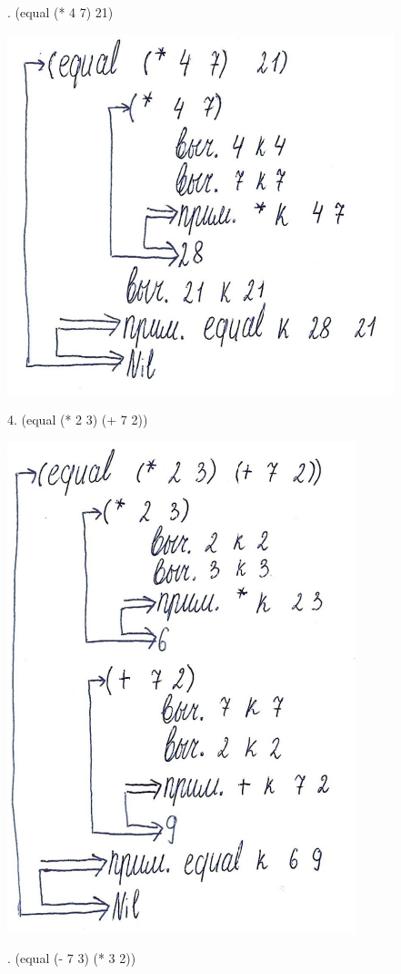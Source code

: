 \documentclass[12pt]{report}
\begin{document}
. (equal (* 4 7) 21)

\includegraphics[scale=1.5]{img/1.3}

4. (equal (* 2 3) (+ 7 2))

\includegraphics[scale=1.5]{img/1.4}

. (equal (- 7 3) (* 3 2))
\end{document}
